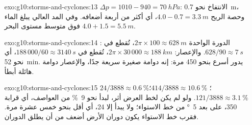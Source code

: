 \begin{solution}{exo:g10:storms-and-cyclones:13}
$\Delta p = 1010 - 940 = \qty{70}{hPa}$: الانتفاخ نحو \qty{0.7}{m}، وحصة
الريح $4.0 - 0.7 = \qty{3.3}{m}$، أي أكثر من أربعة أضعافه. وفي المد العالي يبلغ
الماء $4.0 + 1.5 = \qty{5.5}{m}$ فوق متوسط مستوى البحر.
\end{solution}

\begin{solution}{exo:g10:storms-and-cyclones:14}
: الدورة الواحدة $2\pi \times 100 \approx \qty{628}{m}$، تُقطع في
$628/90 \approx \qty{7}{s}$. والإعصار: $2\pi \times 30\,000 \approx
\qty{188}{km}$، تُقطع في $188\,000/60 \approx \qty{3140}{s}$، أي نحو
\qty{52}{min}.  يدور أسرع بنحو 450 مرة: إنه دوامة صغيرة سريعة
جدًا، والإعصار دوامة هائلة أبطأ.
\end{solution}

\begin{solution}{exo:g10:storms-and-cyclones:15}
$24/3888 \approx \qty{0.6}{\percent}$؛ $414/3888 \approx
\qty{10.6}{\percent}$؛ $121/3888 \approx \qty{3.1}{\percent}$. ولو لم يكن لخط
العرض أثر، لبدأ نحو \qty{9}{\percent} من العواصف، أي قرابة 350، على بعد
\qty{5}{\degree} من خط الاستواء؛ ولا يبدأ إلا 24، أي أقل بنحو خمس عشرة مرة. فقرب
خط الاستواء يكون دوران الأرض أضعف من أن يطلق الدوران.
\end{solution}

